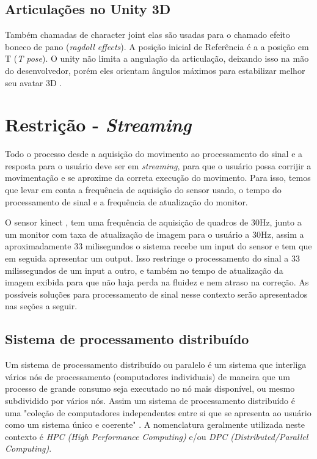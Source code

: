 \begin{table}[H]
\begin{tabular}{|c|c|c|}
   \end{tabular}
   \end{table}


  \subsection{Articulações no Unity 3D}
  \label{sec:Articulacoes no Unity 3D}
    Também chamadas de character joint elas são usadas para o chamado efeito
  boneco de pano (\textit{ragdoll effects}). A posição inicial de Referência é a
  a posição em T (\textit{T pose}). O unity não limita a angulação da articulação,
  deixando isso na mão do desenvolvedor, porém eles orientam ângulos máximos
  para estabilizar melhor seu avatar 3D \cite{unity3DManual}.

  \section{Restrição - \textit{Streaming}}
  \label{sec:restrição}
    Todo o processo desde a aquisição do movimento ao processamento do sinal e a
  resposta para o usuário  deve ser em \textit{streaming}, para que o usuário possa corrijir a movimentação e se
  aproxime da correta execução do movimento. Para isso, temos que levar em conta
  a frequência de aquisição do sensor usado, o tempo do processamento de sinal e
  a frequência de atualização do monitor.

    O sensor kinect \cite{microsoftResearch}, tem uma frequência de
  aquisição de quadros de 30Hz, junto a um monitor com taxa de atualização de imagem
  para o usuário a 30Hz, assim a aproximadamente 33 milisegundos o
  sistema recebe um input do sensor e tem que em seguida apresentar um output. Isso restringe o processamento do sinal a 33 milissegundos de um input a outro, e
  também no tempo de atualização da imagem exibida para que não haja perda na
  fluidez e nem atraso na correção. As possíveis soluções para processamento de sinal nesse contexto serão apresentados nas seções a seguir.

  \subsection{Sistema de processamento distribuído}\label{distribuirProcessamento}
  Um sistema de processamento distribuído ou paralelo é um sistema que interliga vários nós de processamento (computadores individuais) de maneira que um processo de grande consumo seja executado no nó mais disponível, ou mesmo subdividido por vários nós. Assim um sistema de processamento distribuído é uma "coleção de computadores independentes entre si que se apresenta ao usuário como um sistema único e coerente" \cite{tanenbaum}. A nomenclatura geralmente utilizada neste contexto é \textit{HPC (High Performance Computing)} e/ou \textit{DPC (Distributed/Parallel Computing)}.

